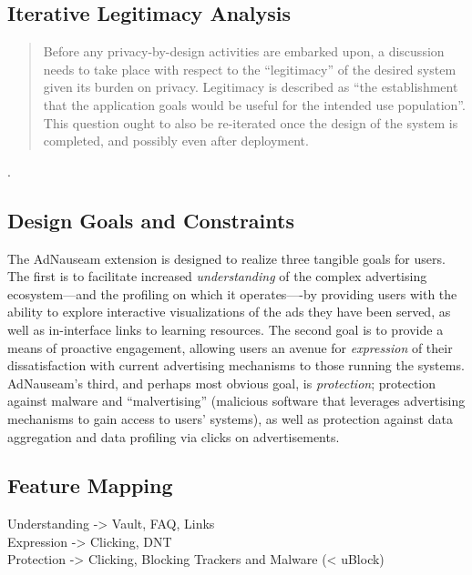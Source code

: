 \documentclass[conference]{IEEEtran}
\begin{document}
\subsection{Iterative Legitimacy Analysis}

\blockquote{Before any privacy-by-design activities are embarked upon, a discussion needs to take place with respect to the ``legitimacy'' of the desired system given its burden on privacy.
Legitimacy is described as ``the establishment that the application goals would be useful for the intended use population''. This question ought to also be re-iterated once the design
of the system is completed, and possibly even after deployment.}\cite{Iachello}.


\subsection{Design Goals and Constraints}

The AdNauseam extension is designed to realize three tangible goals for users. The first is to facilitate increased \emph{understanding} of the complex advertising ecosystem---and the profiling on which it operates----by providing users with the ability to explore interactive visualizations of the ads they have been served, as well as in-interface links to learning resources. The second goal is to provide a means of proactive engagement, allowing users an avenue for \emph{expression} of their dissatisfaction with current advertising mechanisms to those running the systems. AdNauseam's third, and perhaps most obvious goal, is \emph{protection}; protection against malware and ``malvertising'' (malicious software that leverages advertising mechanisms to gain access to users' systems)\cite{Mansfield}, as well as protection against data aggregation and data profiling via clicks on advertisements.

\subsection{Feature Mapping}

Understanding -> Vault, FAQ, Links\\
Expression -> Clicking, DNT\\
Protection -> Clicking, Blocking Trackers and Malware (< uBlock)\\
\end{document}
